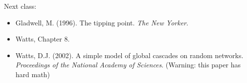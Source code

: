 \documentclass[aspectratio=169]{beamer}
\begin{document}
\begin{frame}

Next class:
\begin{itemize}
\item Gladwell, M. (1996). The tipping point. \textit{The New Yorker}. 
\item Watts, Chapter 8.
\item Watts, D.J. (2002). A simple model of global cascades on random networks. \textit{Proceedings of the National Academy of Sciences}. (Warning: this paper has hard math)
\end{itemize}

\end{frame}
\end{document}
